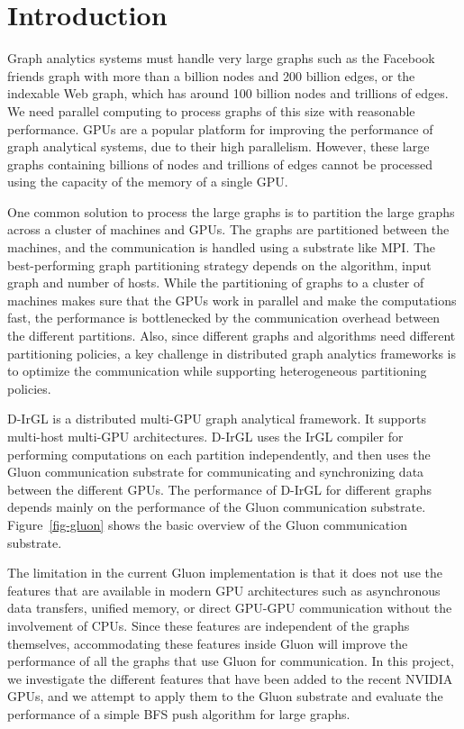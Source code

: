\section{Introduction}
\label{sec-intro}

Graph analytics systems must handle very large graphs such as the Facebook friends graph with more than a billion nodes and 200 billion edges, or the indexable Web graph, which has around 100 billion nodes and trillions of edges. We need parallel computing to process graphs of this size with reasonable performance. GPUs are a popular platform for improving the performance of graph analytical systems, due to their high parallelism. However, these large graphs containing billions of nodes and trillions of edges cannot be processed using the capacity of the memory of a single GPU. 

One common solution to process the large graphs is to partition the large graphs across a cluster of machines and GPUs. The graphs are partitioned between the machines, and the communication is handled using a substrate like MPI. The best-performing graph partitioning strategy depends on the algorithm, input graph and number of hosts. While the partitioning of graphs to a cluster of machines makes sure that the GPUs work in parallel and make the computations fast, the performance is bottlenecked by the communication overhead between the different partitions. Also, since different graphs and algorithms need different partitioning policies, a key challenge in distributed graph analytics frameworks is to optimize the communication while supporting heterogeneous partitioning policies. 


D-IrGL is a distributed multi-GPU graph analytical framework. It supports multi-host multi-GPU architectures. D-IrGL uses the IrGL compiler for performing computations on each partition independently, and then uses the Gluon communication substrate for communicating and synchronizing data between the different GPUs. The performance of D-IrGL for different graphs depends mainly on the performance of the Gluon communication substrate. Figure~\ref{fig-gluon} shows the basic overview of the Gluon communication substrate. 

The limitation in the current Gluon implementation is that it does not use the features that are available in modern GPU architectures such as asynchronous data transfers, unified memory, or direct GPU-GPU communication without the involvement of CPUs. Since these features are independent of the graphs themselves, accommodating these features inside Gluon will improve the performance of all the graphs that use Gluon for communication. In this project, we  investigate the different features that have been added to the recent NVIDIA GPUs, and we attempt to apply them to the Gluon substrate and evaluate the performance of a simple BFS push algorithm for large graphs. 

